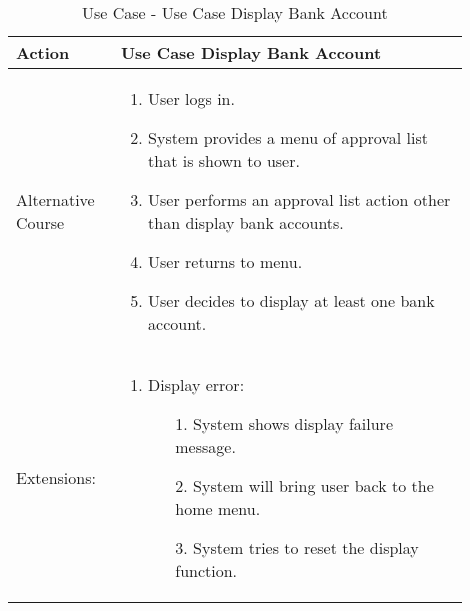 \documentclass{article}
\newcounter{use case ID}
\newcommand\tabularhead[1]{
\begin{table}[ht]
    \addtocounter{use case ID}{1}
    \caption{Use Case \arabic{use case ID} - #1}
    \vspace{0.2cm}
    \begin{tabular}{|p{0.2\linewidth}|p{0.70\linewidth}|}
    \hline
        \textbf{Action} & \textbf{#1} \\
        \hline}
\newcommand\addrow[2]{#1 & #2\\ \hline}
\newcommand\addmulrow[2]{ \begin{minipage}[t][][t]{2.5cm}#1\end{minipage}
        &\begin{minipage}[t][][t]{11cm}
        \begin{enumerate}[itemsep=-1ex] #2   \end{enumerate}
    \end{minipage}\vfill\\ \hline}
\newenvironment{usecase}{\tabularhead}
{\hline\end{tabular}\end{table}}
\begin{document}
\begin{usecase}{Use Case Display Bank Account}
\addmulrow{Alternative Course}{
    \item User logs in.
    \item System provides a menu of approval list that is shown to user.
    \item User performs an approval list action other than display bank accounts.
    \item User returns to menu.
    \item User decides to display at least one bank account.
    
}
\addmulrow{Extensions:}{
	\item Display error:
		\begin{enumerate}
		\item[1.] System shows display failure message.
		\item[2.] System will bring user back to the home menu.
		\item[3.] System tries to reset the display function.
		\end{enumerate}

}


\end{usecase}
\end{document}
